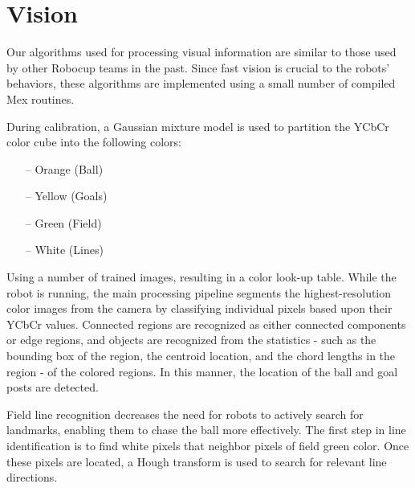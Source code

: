 \documentclass{article}
\begin{document}
\section{Vision}
 	Our algorithms used for processing visual information are similar to those used by other Robocup teams in the past. Since fast vision is crucial to the robots’ behaviors, these algorithms are implemented using a small number of compiled Mex routines.

  During calibration, a Gaussian mixture model is used to partition the YCbCr color cube into the following colors:
	\begin{itemize}
		\item[--] Orange (Ball)
		\item[--] Yellow (Goals)
		\item[--] Green (Field)
		\item[--] White (Lines)
	\end{itemize}

  Using a number of trained images, resulting in a color look-up table. While the robot is running, the main processing pipeline segments the highest-resolution color images from the camera by classifying individual pixels based upon their YCbCr values. Connected regions are recognized as either connected components or edge regions, and objects are recognized from the statistics - such as the bounding box of the region, the centroid location, and the chord lengths in the region - of the colored regions. In this manner, the location of the ball and goal posts are detected.

  Field line recognition decreases the need for robots to actively search for landmarks, enabling them to chase the ball more effectively. The first step in line identification is to find white pixels that neighbor pixels of field green color. Once these pixels are located, a Hough transform is used to search for relevant line directions.
\end{document}
